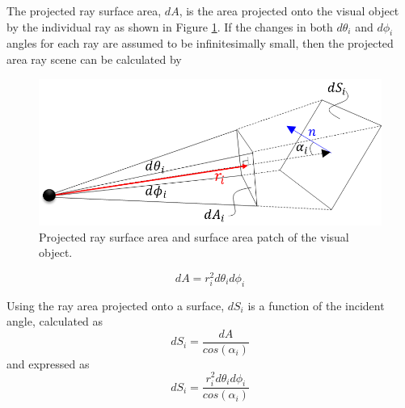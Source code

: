 \documentclass[utf8]{frontiersSCNS} %
\begin{document}
The projected ray surface area, $dA$, is the area projected onto the visual object by the individual ray as shown in Figure \ref{f:projectsurface}. If the changes in both $d\theta_i$ and $d\phi_i$ angles for each ray are assumed to be infinitesimally small, then the projected area ray scene can be calculated by

\begin{figure}[ht]
  \centering
  \includegraphics[width=\columnwidth]{images/sonar_surface.png}
  \caption{Projected ray surface area and surface area patch of the visual object.}
  \label{f:projectsurface}
\end{figure} 

\begin{equation}
    dA = r_i^2 d \theta_i d \phi_i
\end{equation}

Using the ray area projected onto a surface, $dS_i$ is a function of the incident angle, calculated as
\begin{equation}
    dS_i = \frac{dA}{cos(\alpha_i)}
\end{equation}
and expressed as
\begin{equation}
    dS_i = \frac{r_i^2 d \theta_i d \phi_i}{cos(\alpha_i)}
\end{equation}
\end{document}
